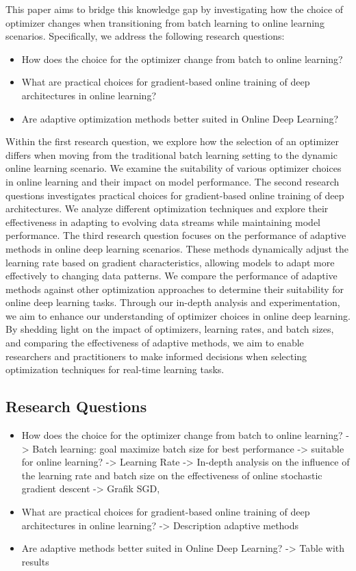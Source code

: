 \documentclass[letterpaper]{article} %
\begin{document}
This paper aims to bridge this knowledge gap by investigating how the choice of optimizer changes when transitioning from batch learning to online learning scenarios. Specifically, we address the following research questions:
\begin{itemize}
	\item How does the choice for the optimizer change from batch to online learning?
	\item What are practical choices for gradient-based online training of deep architectures in online learning?
	\item Are adaptive optimization methods better suited in Online Deep Learning?
\end{itemize}
Within the first research question, we explore how the selection of an optimizer differs when moving from the traditional batch learning setting to the dynamic online learning scenario. We examine the suitability of various optimizer choices in online learning and their impact on model performance.
The second research questions investigates practical choices for gradient-based online training of deep architectures.
We analyze different optimization techniques and explore their effectiveness in adapting to evolving data streams while maintaining model performance.
The third research question focuses on the performance of adaptive methods in online deep learning scenarios.
These methods dynamically adjust the learning rate based on gradient characteristics, allowing models to adapt more effectively to changing data patterns. We compare the performance of adaptive methods against other optimization approaches to determine their suitability for online deep learning tasks.
Through our in-depth analysis and experimentation, we aim to enhance our understanding of optimizer choices in online deep learning.
By shedding light on the impact of optimizers, learning rates, and batch sizes, and comparing the effectiveness of adaptive methods, we aim to enable researchers and practitioners to make informed decisions when selecting optimization techniques for real-time learning tasks.

\subsection{Research Questions}
\begin{itemize}

	\item How does the choice for the optimizer change from batch to online learning?
	      -> Batch learning: goal maximize batch size for best performance -> suitable for online learning?
	      -> Learning Rate
	      -> In-depth analysis on the influence of the learning rate and batch size on the effectiveness of online stochastic gradient descent
	      -> Grafik SGD,
	\item What are practical choices for gradient-based online training of deep architectures in online learning?
	      -> Description adaptive methods
	\item Are adaptive methods better suited in Online Deep Learning?
	      -> Table with results
\end{itemize}
\end{document}
